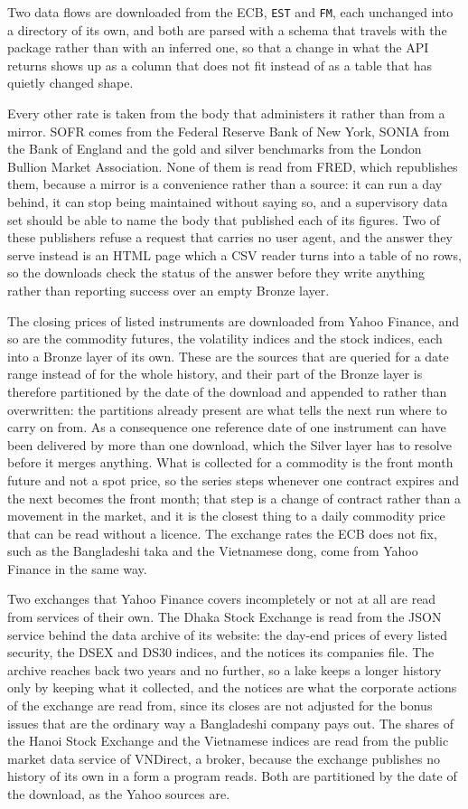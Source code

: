Two data flows are downloaded from the ECB, \verb|EST| and \verb|FM|, each unchanged into a directory of its own, and both are parsed with a schema that travels with the package rather than with an inferred one, so that a change in what the API returns shows up as a column that does not fit instead of as a table that has quietly changed shape.

Every other rate is taken from the body that administers it rather than from a mirror. SOFR comes from the Federal Reserve Bank of New York, SONIA from the Bank of England and the gold and silver benchmarks from the London Bullion Market Association. None of them is read from FRED, which republishes them, because a mirror is a convenience rather than a source: it can run a day behind, it can stop being maintained without saying so, and a supervisory data set should be able to name the body that published each of its figures. Two of these publishers refuse a request that carries no user agent, and the answer they serve instead is an HTML page which a CSV reader turns into a table of no rows, so the downloads check the status of the answer before they write anything rather than reporting success over an empty Bronze layer.

The closing prices of listed instruments are downloaded from Yahoo Finance, and so are the commodity futures, the volatility indices and the stock indices, each into a Bronze layer of its own. These are the sources that are queried for a date range instead of for the whole history, and their part of the Bronze layer is therefore partitioned by the date of the download and appended to rather than overwritten: the partitions already present are what tells the next run where to carry on from. As a consequence one reference date of one instrument can have been delivered by more than one download, which the Silver layer has to resolve before it merges anything. What is collected for a commodity is the front month future and not a spot price, so the series steps whenever one contract expires and the next becomes the front month; that step is a change of contract rather than a movement in the market, and it is the closest thing to a daily commodity price that can be read without a licence. The exchange rates the ECB does not fix, such as the Bangladeshi taka and the Vietnamese dong, come from Yahoo Finance in the same way.

Two exchanges that Yahoo Finance covers incompletely or not at all are read from services of their own. The Dhaka Stock Exchange is read from the JSON service behind the data archive of its website: the day-end prices of every listed security, the DSEX and DS30 indices, and the notices its companies file. The archive reaches back two years and no further, so a lake keeps a longer history only by keeping what it collected, and the notices are what the corporate actions of the exchange are read from, since its closes are not adjusted for the bonus issues that are the ordinary way a Bangladeshi company pays out. The shares of the Hanoi Stock Exchange and the Vietnamese indices are read from the public market data service of VNDirect, a broker, because the exchange publishes no history of its own in a form a program reads. Both are partitioned by the date of the download, as the Yahoo sources are.

